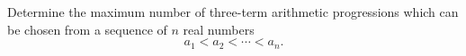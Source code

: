 Determine the maximum number of three-term arithmetic progressions which can be chosen from a sequence of $n$ real numbers \[a_1<a_2<\cdots<a_n.\]
